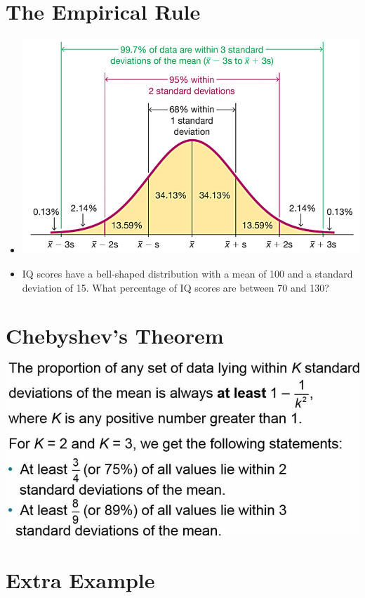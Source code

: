 \documentclass[]{book}
\providecommand{\tightlist}{%
  \setlength{\itemsep}{0pt}\setlength{\parskip}{0pt}}
\begin{document}
\hypertarget{the-empirical-rule}{%
\section{The Empirical Rule}\label{the-empirical-rule}}

\begin{itemize}
\tightlist
\item
  \includegraphics{pic10.png}
\item
  IQ scores have a bell-shaped distribution with a mean of 100 and a standard deviation of 15. What percentage of IQ scores are between 70 and 130?
\end{itemize}

\hypertarget{chebyshevs-theorem}{%
\section{Chebyshev's Theorem}\label{chebyshevs-theorem}}

\includegraphics{pic11.jpg}

\hypertarget{extra-example}{%
\section{Extra Example}\label{extra-example}}
\end{document}
